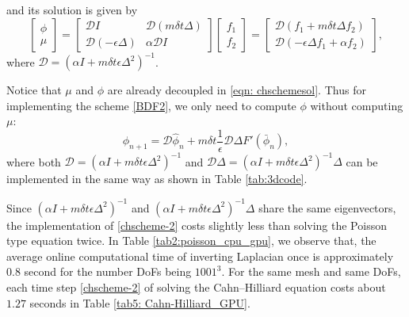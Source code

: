 \documentclass{article}
\begin{document}
and its solution is given by
\begin{equation}
    \begin{bmatrix}
        \phi\\
        \mu
    \end{bmatrix}
    =
    \begin{bmatrix}
         \mathcal{D} I & \mathcal{D}(m\delta t\Delta)\\
        \mathcal{D} (-\epsilon\Delta) & \alpha \mathcal{D} I
    \end{bmatrix}
    \begin{bmatrix}
        f_1\\
        f_2
    \end{bmatrix}
    =
    \begin{bmatrix}
        \mathcal{D}(f_1 + m\delta t\Delta f_2)\\
        \mathcal{D}(-\epsilon\Delta f_1 + \alpha f_2)
    \end{bmatrix},
    \label{eqn: chschemesol}
\end{equation}
where $\mathcal{D} = (\alpha I + m\delta t\epsilon\Delta^2)^{-1}$. 

Notice that $\mu$ and $\phi$ are already decoupled in \eqref{eqn: chschemesol}. Thus for implementing the scheme \eqref{BDF2}, we only need to compute $\phi$ without computing $\mu$:
\begin{equation}
    \label{chscheme-2}
    \phi_{n+1} = \mathcal{D}  \hat{\phi}_n+m\delta t \frac{1}{\epsilon}\mathcal{D} \Delta F'(\bar{\phi}_{n}),
\end{equation}
where
both $\mathcal{D} = (\alpha I + m\delta t\epsilon\Delta^2)^{-1}$ and $\mathcal{D}\Delta = (\alpha I + m\delta t\epsilon\Delta^2)^{-1}\Delta$ can be implemented in the same way as shown in Table \ref{tab:3dcode}.

Since $(\alpha I + m\delta t\epsilon\Delta^2)^{-1}$ and $(\alpha I + m\delta t\epsilon\Delta^2)^{-1}\Delta$ share the same eigenvectors, the implementation of \eqref{chscheme-2} costs slightly less than solving the  Poisson type equation twice. In Table \ref{tab2:poisson_cpu_gpu},
we observe that,  the average online computational time of inverting Laplacian once is approximately $0.8$ second for the number DoFs being $1001^3$. For the same mesh and same DoFs, each time step \eqref{chscheme-2} of solving the Cahn--Hilliard equation costs about $1.27$ seconds in Table \ref{tab5: Cahn-Hilliard_GPU}.
\end{document}
